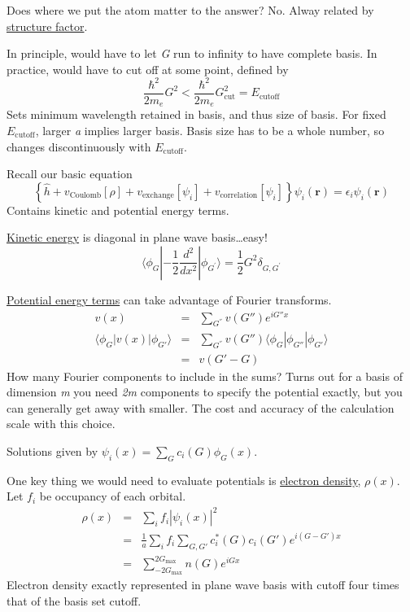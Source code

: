 \documentclass[11pt]{article}
\begin{document}
Does where we put the atom matter to the answer? No. Alway related by \uline{structure factor}.

In principle, would have to let \emph{G} run to infinity to have complete basis. In practice, would have to cut off at some point, defined by
\[ \frac{\hbar^2}{2 m_e} G^2 < \frac{\hbar^2}{2 m_e} G_\text{cut}^2 = E_\text{cutoff} \]
Sets minimum wavelength retained in basis, and thus size of basis. For fixed \(E_\text{cutoff}\), larger \emph{a} implies larger basis.  Basis size has to be a whole number, so changes discontinuously with \(E_\text{cutoff}\).

Recall our basic equation
\begin{equation}
\left \{ \hat{h} +v_{\text{Coulomb}}[\rho] + v_\text{exchange}[\psi_{i}] + v_\text{correlation}[\psi_{i}]\right\}\psi_i(\mathbf{r}) =\epsilon_i \psi_i(\mathbf{r})
\end{equation} 
Contains kinetic and potential energy terms.

\uline{Kinetic energy} is diagonal in plane wave basis\ldots{}easy!
\[ \langle \phi_G | -\frac{1}{2}\frac{d^2}{dx^2} | \phi_{G^\prime} \rangle = \frac{1}{2}G^2 \delta_{G,G^\prime} \]

\uline{Potential energy terms} can take advantage of Fourier transforms.
\begin{eqnarray}
v(x) & = & \sum_{G^{''}} v(G'') e^{i G'' x}  \\
\langle \phi_G | v(x) | \phi_{G'}\rangle & = & \sum_{G^{''}} v(G'') \langle \phi_G | \phi_{G''} |  \phi_{G'} \rangle \\
 & = & v(G'-G) 
\end{eqnarray}
How many Fourier components to include in the sums? Turns out for a basis of dimension \emph{m} you need \emph{2m} components to specify the potential exactly, but you can generally get away with smaller. The cost and accuracy of the calculation scale with this choice.

Solutions given by \(\psi_i(x) = \sum_G c_i(G) \phi_G(x)\).

One key thing we would need to evaluate potentials is \uline{electron density}, \(\rho(x)\).  Let \(f_i\) be occupancy of each orbital.
\begin{eqnarray}
 \rho(x) & = & \sum_i f_i |\psi_i(x)|^2 \\
         & = & \frac{1}{a}\sum_i f_i \sum_{G,G'} c_i^*(G)c_i(G') e^{i(G-G')x} \\
	 & = & \sum_{-2 G_\mathrm{max}}^{2 G_\mathrm{max}} n(G) e^{i G x} 
\end{eqnarray}
Electron density exactly represented in plane wave basis with cutoff four times that of the basis set cutoff.
\end{document}
